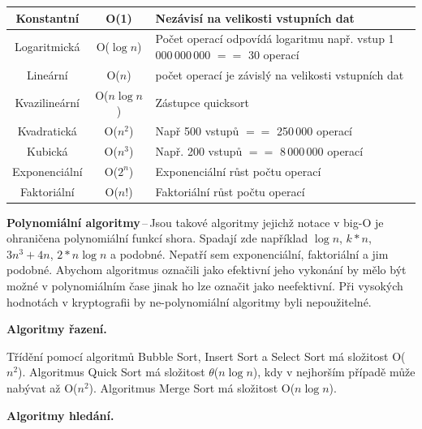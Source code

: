 \begin{table}[h]
    \begin{tabularx}{\textwidth}{|c|c|X|}\hline
        Konstantní & O(1) & Nezávisí na velikosti vstupních dat\\\hline
        Logaritmická & O($\log{n}$) & Počet operací odpovídá logaritmu např. vstup 1\,000\,000\,000 $==$ 30 operací\\\hline
        Lineární & O($n$)& počet operací je závislý na velikosti vstupních dat\\\hline
        Kvazilineární& O($n\log{n}$)& Zástupce quicksort\\\hline
        Kvadratická& O($n^2$)& Např 500 vstupů $==$ 250\,000 operací\\\hline
        Kubická & O($n^3$)& Např. 200 vstupů $==$ 8\,000\,000 operací\\\hline
        Exponenciální&O($2^n$)& Exponenciální růst počtu operací\\\hline
        Faktoriální&O($n!$)& Faktoriální růst počtu operací\\\hline
    \end{tabularx}
\end{table}

\textbf{Polynomiální algoritmy}\,--\,Jsou takové algoritmy jejichž notace v big-O je ohraničena polynomiální funkcí shora. Spadají zde například $\log{n}$, $k*n$, $3n^3 + 4n$, $2*n\log{n}$ a podobné. Nepatří sem exponenciální, faktoriální a jim podobné. Abychom algoritmus označili jako efektivní jeho vykonání by mělo být možné v polynomiálním čase jinak ho lze označit jako neefektivní. Při vysokých hodnotách v kryptografii by ne-polynomiální algoritmy byli nepoužitelné.

\begin{Large}\vspace{0,5cm} \textbf{Algoritmy řazení.}
\end{Large}

Třídění pomocí algoritmů Bubble Sort, Insert Sort a Select Sort má složitost O($n^2$). Algoritmus Quick Sort má složitost $\theta$($n\log{n}$), kdy v nejhorším případě může nabývat až O($n^2$). Algoritmus Merge Sort má složitost O($n\log{n}$).

\vspace{1cm}
\begin{Large}\vspace{0,5cm} \textbf{Algoritmy hledání.}
\end{Large}

